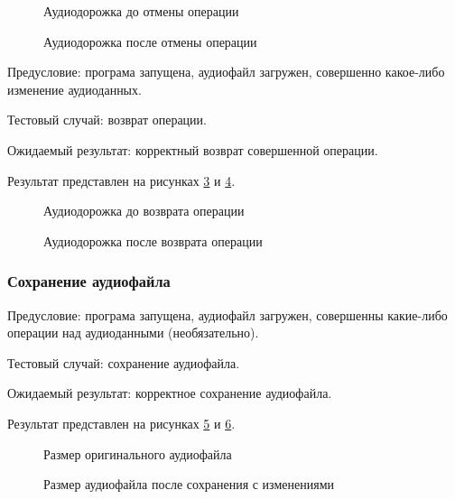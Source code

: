 \begin{figure}[H]
	\caption{Аудиодорожка до отмены операции}
	\label{test_case19:image}
\end{figure}

\begin{figure}[H] 
	\caption{Аудиодорожка после отмены операции}
	\label{test_case20:image}
\end{figure}

Предусловие: програма запущена, аудиофайл загружен, совершенно какое-либо изменение аудиоданных.

Тестовый случай: возврат операции.

Ожидаемый результат: корректный возврат совершенной операции.

Результат представлен на рисунках \ref{test_case21:image} и \ref{test_case22:image}.

\begin{figure}[H]
	\caption{Аудиодорожка до возврата операции}
	\label{test_case21:image}
\end{figure}

\begin{figure}[H] 
	\caption{Аудиодорожка после возврата операции}
	\label{test_case22:image}
\end{figure}

\subsubsection{Сохранение аудиофайла}

Предусловие: програма запущена, аудиофайл загружен, совершенны какие-либо операции над аудиоданными (необязательно).

Тестовый случай: сохранение аудиофайла.

Ожидаемый результат: корректное сохранение аудиофайла.

Результат представлен на рисунках \ref{test_case23:image} и \ref{test_case24:image}.

\begin{figure}[H]
	\caption{Размер оригинального аудиофайла}
	\label{test_case23:image}
\end{figure}

\begin{figure}[H] 
	\caption{Размер аудиофайла после сохранения с изменениями}
	\label{test_case24:image}
\end{figure}